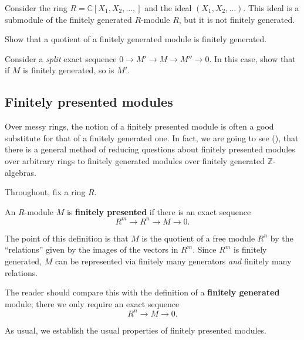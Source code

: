 \begin{example} 
Consider the ring $R=\mathbb{C}[X_1, X_2, \dots,]$ and the ideal $(X_1, X_2,
\dots)$. This ideal is a submodule of the finitely generated $R$-module $R$,
but it is not finitely generated.
\end{example} 

\begin{exercise} 
Show that a quotient of a finitely generated module is finitely generated.
\end{exercise}

\begin{exercise} 
Consider a \emph{split} exact sequence $0 \to M' \to M \to M'' \to 0$. In this
case, show that if $M$ is finitely generated, so is $M'$.
\end{exercise} 


\subsection{Finitely presented modules}

Over messy rings, the notion of a finitely presented module is often a good
substitute for that of a finitely generated one. In fact, we are going to see
(\rref{}), that there is a general method of reducing questions about finitely
presented modules over arbitrary rings to finitely generated modules over
finitely generated $\mathbb{Z}$-algebras.

Throughout, fix a ring $R$.

\begin{definition} 
An $R$-module $M$ is \textbf{finitely presented} if there is an exact sequence
\[ R^m \to R^n \to M \to 0.  \]
\end{definition} 

The point of this definition is that $M$ is the quotient of a free module
$R^n$ by the ``relations'' given by the images of the vectors in $R^m$. 
Since $R^m$ is finitely generated, $M$ can be represented via finitely many
generators \emph{and} finitely many relations.

The reader should compare this with the definition of a \textbf{finitely
generated} module; there we only require an exact sequence
\[ R^n \to M \to 0.  \]

As usual, we establish the usual properties of finitely presented modules.

